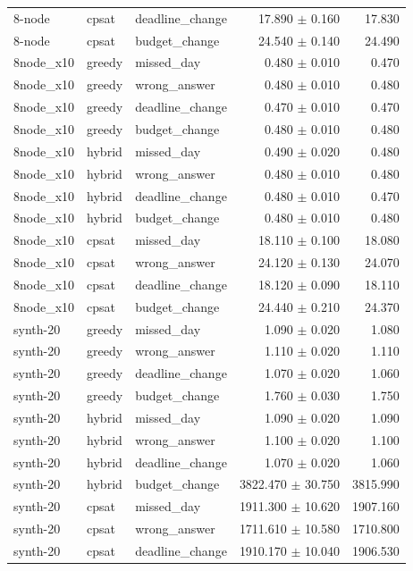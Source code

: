 \begin{table}[htbp]
\begin{tabular}{lllrr}
8-node & cpsat & deadline\_change & 17.890 $\pm$ 0.160 & 17.830 \\
8-node & cpsat & budget\_change & 24.540 $\pm$ 0.140 & 24.490 \\
8node\_x10 & greedy & missed\_day & 0.480 $\pm$ 0.010 & 0.470 \\
8node\_x10 & greedy & wrong\_answer & 0.480 $\pm$ 0.010 & 0.480 \\
8node\_x10 & greedy & deadline\_change & 0.470 $\pm$ 0.010 & 0.470 \\
8node\_x10 & greedy & budget\_change & 0.480 $\pm$ 0.010 & 0.480 \\
8node\_x10 & hybrid & missed\_day & 0.490 $\pm$ 0.020 & 0.480 \\
8node\_x10 & hybrid & wrong\_answer & 0.480 $\pm$ 0.010 & 0.480 \\
8node\_x10 & hybrid & deadline\_change & 0.480 $\pm$ 0.010 & 0.470 \\
8node\_x10 & hybrid & budget\_change & 0.480 $\pm$ 0.010 & 0.480 \\
8node\_x10 & cpsat & missed\_day & 18.110 $\pm$ 0.100 & 18.080 \\
8node\_x10 & cpsat & wrong\_answer & 24.120 $\pm$ 0.130 & 24.070 \\
8node\_x10 & cpsat & deadline\_change & 18.120 $\pm$ 0.090 & 18.110 \\
8node\_x10 & cpsat & budget\_change & 24.440 $\pm$ 0.210 & 24.370 \\
synth-20 & greedy & missed\_day & 1.090 $\pm$ 0.020 & 1.080 \\
synth-20 & greedy & wrong\_answer & 1.110 $\pm$ 0.020 & 1.110 \\
synth-20 & greedy & deadline\_change & 1.070 $\pm$ 0.020 & 1.060 \\
synth-20 & greedy & budget\_change & 1.760 $\pm$ 0.030 & 1.750 \\
synth-20 & hybrid & missed\_day & 1.090 $\pm$ 0.020 & 1.090 \\
synth-20 & hybrid & wrong\_answer & 1.100 $\pm$ 0.020 & 1.100 \\
synth-20 & hybrid & deadline\_change & 1.070 $\pm$ 0.020 & 1.060 \\
synth-20 & hybrid & budget\_change & 3822.470 $\pm$ 30.750 & 3815.990 \\
synth-20 & cpsat & missed\_day & 1911.300 $\pm$ 10.620 & 1907.160 \\
synth-20 & cpsat & wrong\_answer & 1711.610 $\pm$ 10.580 & 1710.800 \\
synth-20 & cpsat & deadline\_change & 1910.170 $\pm$ 10.040 & 1906.530 \\

\end{tabular}
\end{table}
